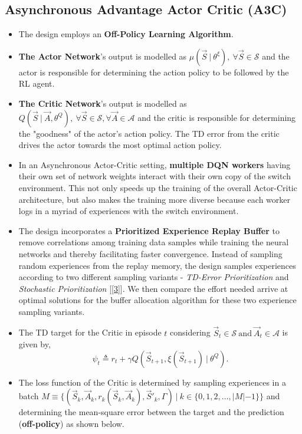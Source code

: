 \documentclass{article}
\begin{document}
\subsection{Asynchronous Advantage Actor Critic (A3C)}
\begin{itemize}
    \item The design employs an \textbf{Off-Policy Learning Algorithm}.
    \item \textbf{The Actor Network}'s output is modelled as $\mu(\vec{S}\ |\ \theta^{\xi}),\ \forall \vec{S} \in \mathcal{S}$ and the actor is responsible for determining the action policy to be followed by the RL agent.
    \item \textbf{The Critic Network}'s output is modelled as $Q(\vec{S}\ |\ \vec{A}, \theta^{Q}),\ \forall \vec{S} \in \mathcal{S}, \forall \vec{A} \in \mathcal{A}$ and the critic is responsible for determining the "goodness" of the actor's action policy. The TD error from the critic drives the actor towards the most optimal action policy.
    \item In an Asynchronous Actor-Critic setting, \textbf{multiple DQN workers} having their own set of network weights interact with their own copy of the switch environment. This not only speeds up the training of the overall Actor-Critic architecture, but also makes the training more diverse because each worker logs in a myriad of experiences with the switch environment.
    \item The design incorporates a \textbf{Prioritized Experience Replay Buffer} to remove correlations among training data samples while training the neural networks and thereby facilitating faster convergence. Instead of sampling random experiences from the replay memory, the design samples experiences according to two different sampling variants - \textit{TD-Error Prioritization} and \textit{Stochastic Prioritization} [\ref{3}]. We then compare the effort needed arrive at optimal solutions for the buffer allocation algorithm for these two experience sampling variants.
    \item The TD target for the Critic in episode $t$ considering $\vec{S}_t \in \mathcal{S}\ \text{and}\ \vec{A}_t \in \mathcal{A}$ is given by,
    \begin{equation}
        \psi_{t} \triangleq r_t + \gamma Q(\vec{S}_{t+1}, \xi(\vec{S}_{t+1})\ |\ \theta^{Q}).
    \end{equation}
    \item The loss function of the Critic is determined by sampling experiences in a batch $M \equiv \{(\vec{S}_{k}, \vec{A}_{k}, r_{k}(\vec{S}_{k}, \vec{A}_{k}), \vec{S}'_{k}, \Gamma)\ |\ k \in \{0, 1, 2, \dots, |M| - 1\}\}$ and determining the mean-square error between the target and the prediction (\textbf{off-policy}) as shown below.

\end{itemize}
\end{document}
